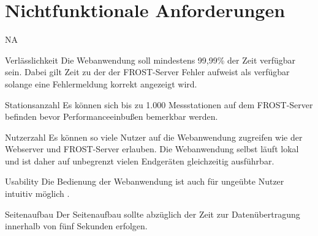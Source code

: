 \section{Nichtfunktionale Anforderungen}

\setcounter{counter}{10}
\begin{Kriterien}{NA}
    \item[Verlässlichkeit]
        Die \gls{Webanwendung} soll mindestens 99,99\% der Zeit verfügbar sein.
        Dabei gilt Zeit zu der der \gls{FROST-Server} Fehler aufweist als verfügbar solange eine Fehlermeldung korrekt angezeigt wird.
    \item[Stationsanzahl]
        Es können sich bis zu 1.000 Messstationen auf dem \gls{FROST-Server} befinden bevor Performanceeinbußen bemerkbar werden.
    \item[Nutzerzahl]
        Es können so viele Nutzer auf die \gls{Webanwendung} zugreifen wie der \gls{Webserver} und \gls{FROST-Server} erlauben.
        Die \gls{Webanwendung} selbst läuft lokal und ist daher auf unbegrenzt vielen Endgeräten gleichzeitig ausführbar.
    \item[Usability]
        Die Bedienung der \gls{Webanwendung} ist auch für ungeübte Nutzer intuitiv möglich .
    \item[Seitenaufbau]
        Der Seitenaufbau sollte abzüglich der Zeit zur Datenübertragung innerhalb von fünf Sekunden erfolgen.
\end{Kriterien}